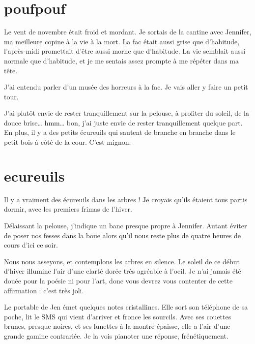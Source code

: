 \section{poufpouf}
Le vent de novembre était froid et mordant. Je sortais de la cantine avec Jennifer, ma meilleure copine à la vie à la mort. La fac était aussi grise que d'habitude, l'après-midi promettait d'être aussi morne que d'habitude. La vie semblait aussi normale que d'habitude, et je me sentais assez prompte à me répéter dans ma tête.

\item J'ai entendu parler d'un musée des horreurs à la fac. Je vais aller y faire un petit tour. 
\item J'ai plutôt envie de rester tranquillement sur la pelouse, à profiter du soleil, de la douce brise… hmm… bon, j'ai juste envie de rester tranquillement quelque part. En plus, il y a des petits écureuils qui sautent de branche en branche dans le petit bois à côté de la cour. C'est mignon. 
\enw


\section{ecureuils}

Il y a vraiment des écureuils dans les arbres ! Je croyais qu'ils étaient tous partis dormir, avec les premiers frimas de l'hiver.

Délaissant la pelouse, j'indique un banc presque propre à Jennifer. Autant éviter de poser nos fesses dans la boue alors qu'il nous reste plus de quatre heures de cours d'ici ce soir.

Nous nous asseyons, et contemplons les arbres en silence. Le soleil de ce début d'hiver illumine l'air d'une clarté dorée très agréable à l'oeil. Je n'ai jamais été douée pour la poésie ni pour l'art, donc vous devrez vous contenter de cette affirmation : c'est très joli.

Le portable de Jen émet quelques notes cristallines. Elle sort son téléphone de sa poche, lit le SMS qui vient d'arriver et fronce les sourcils. Avec ses couettes brunes, presque noires, et ses lunettes à la montre épaisse, elle a l'air d'une grande gamine contrariée. Je la vois pianoter une réponse, frénétiquement.

